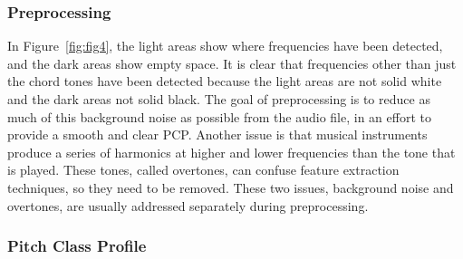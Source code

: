 \documentclass{sig-alternate}
\begin{document}
\subsubsection{Preprocessing}

In Figure~\ref{fig:fig4}, the light areas show where frequencies have been detected, and the dark areas show empty space. It is clear that frequencies other than just the chord tones have been detected because the light areas are not solid white and the dark areas not solid black. The goal of preprocessing is to reduce as much of this background noise as possible from the audio file, in an effort to provide a smooth and clear PCP. Another issue is that musical instruments produce a series of harmonics at higher and lower frequencies than the tone that is played. These tones, called overtones, can confuse feature extraction techniques, so they need to be removed. These two issues, background noise and overtones, are usually addressed separately during preprocessing. \\





\subsubsection{Pitch Class Profile} 
\end{document}
